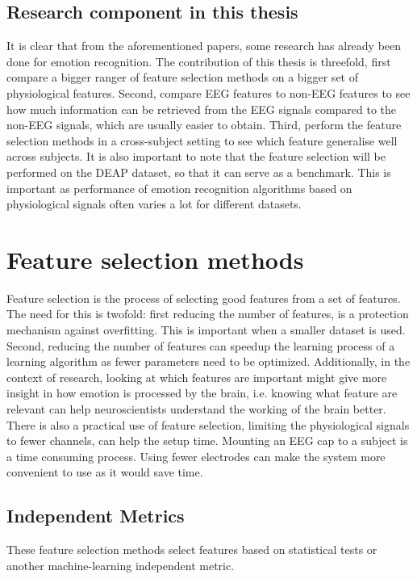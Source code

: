 \subsection{Research component in this thesis}

It is clear that from the aforementioned papers, some research has already been done for emotion recognition. The contribution of this thesis is threefold, first compare a bigger ranger of feature selection methods on a bigger set of physiological features. Second, compare EEG features to non-EEG features to see how much information can be retrieved from the EEG signals compared to the non-EEG signals, which are usually easier to obtain. Third, perform the feature selection methods in a cross-subject setting to see which feature generalise well across subjects. It is also important to note that the feature selection will be performed on the DEAP dataset, so that it can serve as a benchmark. This is important as performance of emotion recognition algorithms based on physiological signals often varies a lot for different datasets\citep{PhytoEm}.

\section{Feature selection methods}
\label{FSSel}
Feature selection is the process of selecting good features from a set of features. The need for this is twofold: first reducing the number of features, is a protection mechanism against overfitting\citep{rfPaper}. This is important when a smaller dataset is used. Second, reducing the number of features can speedup the learning process of a learning algorithm as fewer parameters need to be optimized. Additionally, in the context of research, looking at which features are important might give more insight in how emotion is processed by the brain, i.e. knowing what feature are relevant can help neuroscientists understand the working of the brain better. There is also a practical use of feature selection, limiting the physiological signals to fewer channels, can help the setup time. Mounting an EEG cap to a subject is a time consuming process. Using fewer electrodes can make the system more convenient to use as it would save time.

\subsection{Independent Metrics}
These feature selection methods select features based on statistical tests or another machine-learning independent metric. 


